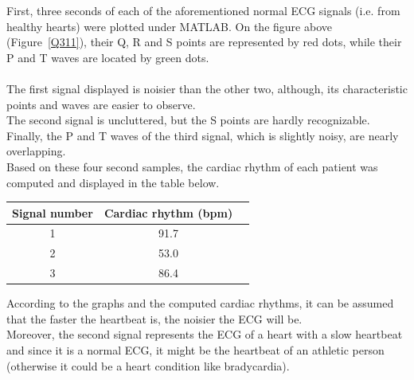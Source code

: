 \documentclass[11pt]{article}
\begin{document}
		First, three seconds of each of the aforementioned normal ECG signals (i.e. from healthy hearts) were plotted under MATLAB. On the figure above (Figure~\ref{Q311}), their Q, R and S points are represented by red dots, while their P and T waves are located by green dots.  \\
		\\
		The first signal displayed is noisier than the other two, although, its characteristic points and waves are easier to observe.\\
		The second signal is uncluttered, but the S points are hardly recognizable.\\
		Finally, the P and T waves of the third signal, which is slightly noisy, are nearly overlapping.\
		\\
		Based on these four second samples, the cardiac rhythm of each patient was computed and displayed in the table below.\\
		\begin{center}
			\begin{tabular}{|c|c|c|}
				\hline
				\textbf{Signal number} & \textbf{Cardiac rhythm (bpm)} \\
				\hline
				1 & 91.7 \\ 
				\hline
				2 & 53.0 \\
				\hline
				3 & 86.4 \\
				\hline
			\end{tabular}
		\end{center}
		\vspace{0.3in}
		According to the graphs and the computed cardiac rhythms, it can be assumed that the faster the heartbeat is, the noisier the ECG will be.\\
		Moreover, the second signal represents the ECG of a heart with a slow heartbeat and since it is a normal ECG, it might be the heartbeat of an athletic person (otherwise it could be a heart condition like bradycardia).\\
		\\
\end{document}
